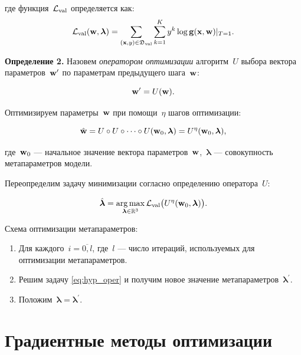 \documentclass[12pt, twoside]{article}
\begin{document}
\noindent
где функция~$\mathcal{L}_\text{val}$ определяется как: 
 \begin{equation} \label{eq:l_val}
     \cL_\text{val}(\bw, \boldsymbol{\lambda}) = \sum\limits_{(\bx, y) \in \fD_\text{val}}\sum\limits_{k=1}^{K}y^k\log \bg(\bx, \bw)|_{T=1}.
 \end{equation}

\textbf{Определение 2.} Назовем \emph{оператором оптимизации} алгоритм~$U$ выбора вектора параметров~$\mathbf{w}^\prime$ по параметрам предыдущего шага~$\mathbf{w}$:

\begin{equation*}
    \mathbf{w}^\prime = U(\mathbf{w}).
\end{equation*}

Оптимизируем параметры~$\mathbf{w}$ при помощи~$\eta$ шагов оптимизации:

\begin{equation} \label{eq:oper_superp}
    \hat{\bw} = U \circ U \circ \dots \circ U(\bw_0, \boldsymbol{\lambda}) = U^\eta(\bw_0, \boldsymbol{\lambda}),
\end{equation}

\noindent
где~$\mathbf{w}_0$ --- начальное значение вектора параметров~$\mathbf{w}$,~$\boldsymbol{\lambda}$ --- совокупность метапараметров модели.

Переопределим задачу минимизации согласно определению оператора~$U$:

\begin{equation} \label{eq:hyp_oper}
    \hat{\boldsymbol{\lambda}} = \argmax\limits_{\boldsymbol{\lambda} \in \bbR^3} \cL_\text{val}\bigl(U^\eta(\bw_0, \boldsymbol{\lambda})\bigr).
\end{equation}

Схема оптимизации метапараметров:

\begin{enumerate}
    \item Для каждого~$i = \overline{0, l}$, где~$l$ --- число итераций, используемых для оптимизации метапараметров.
    \item Решим задачу \eqref{eq:hyp_oper} и получим новое значение метапараметров~$\boldsymbol{\lambda}^\prime$.
    \item Положим~$\boldsymbol{\lambda} = \boldsymbol{\lambda}^\prime$.
\end{enumerate}

\section{Градиентные методы оптимизации}
\end{document}
